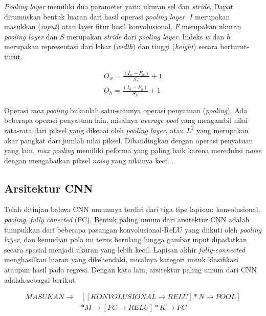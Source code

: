 \emph{Pooling layer} memiliki dua parameter yaitu ukuran sel dan \emph{stride}. Dapat dirumuskan bentuk luaran dari hasil operasi \emph{pooling layer}. $I$ merupakan masukkan (\emph{input}) atau layer fitur hasil konvolusional, $F$ merupakan ukuran \emph{pooling layer} dan $S$ merupakan \emph{stride} dari \emph{pooling layer}. Indeks $w$ dan $h$ merupakan representasi dari lebar (\emph{width}) dan tinggi (\emph{height}) secara berturut-turut.

\begin{equation}\label{max_pooling}
\begin{split}
    O_w = \frac{(I_w - F_w)}{S_w} + 1\\
    O_h = \frac{(I_h - F_h)}{S_h} + 1
\end{split}
\end{equation}

Operasi \emph{max pooling} bukanlah satu-satunya operasi penyatuan (\emph{pooling}). Ada beberapa operasi penyatuan lain, misalnya \emph{average pool} yang mengambil nilai rata-rata dari piksel yang dikenai oleh \emph{pooling layer}, atau $L^2$ yang merupakan akar pangkat dari jumlah nilai piksel. Dibandingkan dengan operasi penyatuan yang lain, \emph{max pooling} memiliki peforma yang paling baik karena mereduksi \emph{noise} dengan mengabaikan piksel \emph{noisy} yang nilainya kecil \citep{patel_2020}.

\subsection{Arsitektur CNN}
Telah ditinjau bahwa CNN umumnya terdiri dari tiga tipe lapisan: konvolusional, \emph{pooling}, \emph{fully conected} (FC). Bentuk paling umum dari arsitektur CNN adalah tumpukkan dari beberapa pasangan konvolusional-ReLU yang diikuti oleh \emph{pooling layer}, dan kemudian pola ini terus berulang hingga gambar input dipadatkan secara spasial menjadi ukuran yang lebih kecil. Lapisan akhir \emph{fully-connected} menghasilkan luaran yang dikehendaki, misalnya kategori untuk klasifikasi ataupun hasil pada regresi. Dengan kata lain, arsitektur paling umum dari CNN adalah sebagai berikut:

\begin{equation*}
    \begin{split}
        MASUKAN \rightarrow &[[KONVOLUSIONAL \rightarrow RELU]*N \rightarrow POOL]\\
        &*M \rightarrow [FC \rightarrow RELU]*K \rightarrow FC
    \end{split}
\end{equation*}

